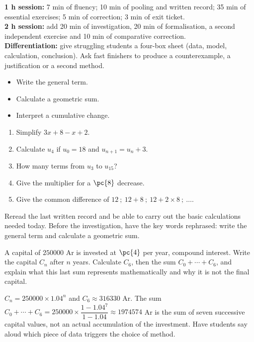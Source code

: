     \ifmxteacher
    \begin{method}
    \textbf{1 h session:} 7 min of fluency; 10 min of pooling and written record; 35 min of essential exercises; 5 min of correction; 3 min of exit ticket.\\
    \textbf{2 h session:} add 20 min of investigation, 20 min of formalisation, a second independent exercise and 10 min of comparative correction.\\
    \textbf{Differentiation:} give struggling students a four-box sheet (data, model, calculation, conclusion). Ask fast finishers to produce a counterexample, a justification or a second method.
    \end{method}
    \fi
{}
\begin{objectives}\begin{itemize}\item Write the general term.\item Calculate a geometric sum.\item Interpret a cumulative change.\end{itemize}\end{objectives}
\begin{fluency}\begin{enumerate}\item Simplify $3x+8-x+2$. \item Calculate $u_4$ if $u_0=18$ and $u_{n+1}=u_n+3$. \item How many terms from $u_3$ to $u_{15}$? \item Give the multiplier for a $\pc{8}$ decrease. \item Give the common difference of $12\ ;\ 12+8\ ;\ 12+2\times8\ ;\ \ldots$. \end{enumerate}\end{fluency}
\begin{prerequisites}Reread the last written record and be able to carry out the basic calculations needed today. Before the investigation, have the key words rephrased: write the general term and calculate a geometric sum.\end{prerequisites}

\begin{activity}
A capital of $\num{250000}$ Ar is invested at $\pc{4}$ per year, compound interest. Write the capital $C_n$ after $n$ years. Calculate $C_6$, then the sum $C_0+\cdots+C_6$, and explain what this last sum represents mathematically and why it is not the final capital.

\end{activity}
\begin{solution}$C_n=\num{250000}\times\num{1,04}^n$ and $C_6\approx\num{316330}$ Ar. The sum $C_0+\cdots+C_6=\num{250000}\times\dfrac{1-\num{1,04}^7}{1-\num{1,04}}\approx\num{1974574}$ Ar is the sum of seven successive capital values, not an actual accumulation of the investment. Have students say aloud which piece of data triggers the choice of method.\end{solution}

